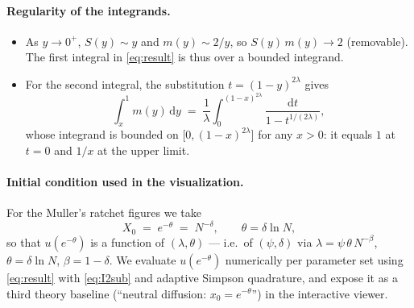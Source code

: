 \documentclass[11pt]{article}
\begin{document}
\paragraph{Regularity of the integrands.}
\begin{itemize}
\item As $y \to 0^+$, $S(y)\sim y$ and $m(y)\sim 2/y$, so $S(y)\,m(y)\to 2$
      (removable). The first integral in \eqref{eq:result} is thus over a
      bounded integrand.
\item For the second integral, the substitution $t=(1-y)^{2\lambda}$ gives
\begin{equation}\label{eq:I2sub}
  \int_x^1 m(y)\,\mathrm{d}y
  \;=\;
  \frac{1}{\lambda}\int_0^{(1-x)^{2\lambda}}\!\!\frac{\mathrm{d}t}{1 - t^{1/(2\lambda)}},
\end{equation}
whose integrand is bounded on $\bigl[0,(1-x)^{2\lambda}\bigr]$ for any $x>0$:
it equals $1$ at $t=0$ and $1/x$ at the upper limit.
\end{itemize}

\paragraph{Initial condition used in the visualization.} For the Muller's
ratchet figures we take
\[
  X_0 \;=\; e^{-\theta} \;=\; N^{-\delta},
  \qquad \theta = \delta \ln N,
\]
so that $u(e^{-\theta})$ is a function of $(\lambda, \theta)$ — i.e.\ of
$(\psi, \delta)$ via $\lambda = \psi\,\theta\,N^{-\beta}$,
$\theta = \delta \ln N$, $\beta = 1-\delta$. We evaluate
$u(e^{-\theta})$ numerically per parameter set using \eqref{eq:result}
with \eqref{eq:I2sub} and adaptive Simpson quadrature, and expose it as a
third theory baseline (``neutral diffusion: $x_0 = e^{-\theta}$'') in the
interactive viewer.
\end{document}
